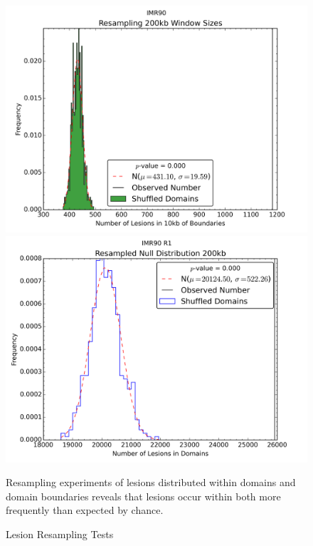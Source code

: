 \begin{figure}[H]
  \caption{Lesion Resampling Tests}\label{fig:LesionsResampled}
  \begin{minipage}{0.5\textwidth}%
    \includegraphics[width=\textwidth]{./figures/results/resamplingInBounds.png}
  \end{minipage}%
  \hfill
  \begin{minipage}{0.5\textwidth}
    \includegraphics[width=\textwidth]{./figures/results/resamplingInDomains.png}
  \end{minipage}
  \small
  Resampling experiments of lesions distributed within domains and domain boundaries reveals that lesions occur within both more
  frequently than expected by chance.
\end{figure}
